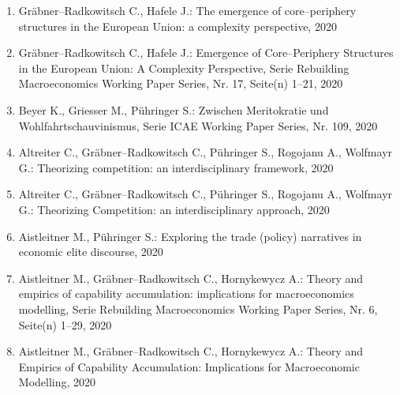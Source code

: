 \begin{enumerate}
	 \item Gräbner--Radkowitsch C., Hafele J.: The emergence of core--periphery structures in the European Union: a complexity perspective, 2020
	 \item Gräbner--Radkowitsch C., Hafele J.: Emergence of Core--Periphery Structures in the European Union: A Complexity Perspective, Serie Rebuilding Macroeconomics Working Paper Series, Nr. 17, Seite(n) 1--21, 2020
	 \item Beyer K., Griesser M., Pühringer S.: Zwischen Meritokratie und Wohlfahrtschauvinismus, Serie ICAE Working Paper Series, Nr. 109, 2020
	 \item Altreiter C., Gräbner--Radkowitsch C., Pühringer S., Rogojanu A., Wolfmayr G.: Theorizing competition: an interdisciplinary framework, 2020
	 \item Altreiter C., Gräbner--Radkowitsch C., Pühringer S., Rogojanu A., Wolfmayr G.: Theorizing Competition: an interdisciplinary approach, 2020
	 \item Aistleitner M., Pühringer S.: Exploring the trade (policy) narratives in economic elite discourse, 2020
	 \item Aistleitner M., Gräbner--Radkowitsch C., Hornykewycz A.: Theory and empirics of capability accumulation: implications for macroeconomics modelling, Serie Rebuilding Macroeconomics Working Paper Series, Nr. 6, Seite(n) 1--29, 2020
	 \item Aistleitner M., Gräbner--Radkowitsch C., Hornykewycz A.: Theory and Empirics of Capability Accumulation: Implications for Macroeconomic Modelling, 2020
\end{enumerate}
